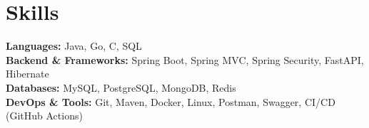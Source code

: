 \section{Skills}

\noindent\textbf{Languages:} Java, Go, C, SQL\\[2pt]
\noindent\textbf{Backend \& Frameworks:} Spring Boot, Spring MVC, Spring Security, FastAPI, Hibernate\\[2pt]
\noindent\textbf{Databases:} MySQL, PostgreSQL, MongoDB, Redis\\[2pt]
\noindent\textbf{DevOps \& Tools:} Git, Maven, Docker, Linux, Postman, Swagger, CI/CD (GitHub Actions)